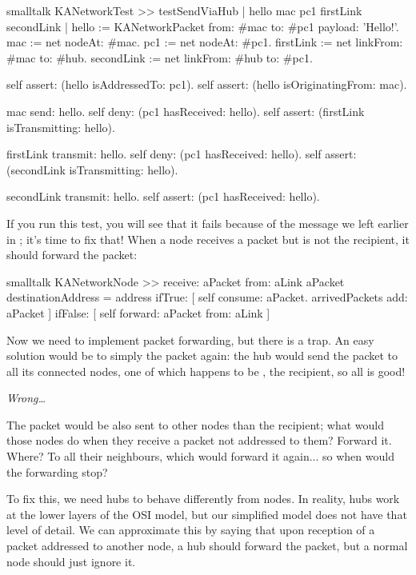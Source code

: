 \documentclass[10pt,twoside,english]{_support/latex/sbabook/sbabook}
\begin{document}
\begin{displaycode}{smalltalk}
KANetworkTest >> testSendViaHub
    | hello mac pc1 firstLink secondLink |
    hello := KANetworkPacket from: #mac to: #pc1 payload: 'Hello!'.
    mac := net nodeAt: #mac.
    pc1 := net nodeAt: #pc1.
    firstLink := net linkFrom: #mac to: #hub.
    secondLink := net linkFrom: #hub to: #pc1.

    self assert: (hello isAddressedTo: pc1).
    self assert: (hello isOriginatingFrom: mac).

    mac send: hello.
    self deny: (pc1 hasReceived: hello).
    self assert: (firstLink isTransmitting: hello).

    firstLink transmit: hello.
    self deny: (pc1 hasReceived: hello).
    self assert: (secondLink isTransmitting: hello).

    secondLink transmit: hello.
    self assert: (pc1 hasReceived: hello).
\end{displaycode}

If you run this test, you will see that it fails because of the  message we left earlier in ; it's time to fix that!
When a node receives a packet but is not the recipient, it should forward the packet:

\begin{displaycode}{smalltalk}
KANetworkNode >> receive: aPacket from: aLink
    aPacket destinationAddress = address
        ifTrue: [
            self consume: aPacket.
            arrivedPackets add: aPacket ]
        ifFalse: [ self forward: aPacket from: aLink ]
\end{displaycode}

Now we need to implement packet forwarding, but there is a trap.
An easy solution would be to simply  the packet again: the hub would send the packet to all its connected nodes, one of which happens to be , the recipient, so all is good!

\textit{Wrong…}

The packet would be also sent to other nodes than the recipient; what would those nodes do when they receive a packet not addressed to them? Forward it. Where? To all their neighbours, which would forward it again... so when would the forwarding stop?

To fix this, we need hubs to behave differently from nodes.
In reality, hubs work at the lower layers of the OSI model, but our simplified model does not have that level of detail.
We can approximate this by saying that upon reception of a packet addressed to another node, a hub should forward the packet, but a normal node should just ignore it.
\end{document}
